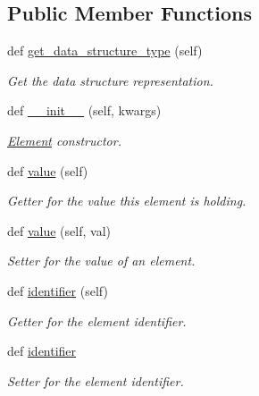 \subsection*{Public Member Functions}
\begin{DoxyCompactItemize}
\item 
def \hyperlink{classbridges_1_1element_1_1_element_a87b8c79123d20eb2af48ae4e4f1bcf32}{get\+\_\+data\+\_\+structure\+\_\+type} (self)
\begin{DoxyCompactList}\small\item\em Get the data structure representation. \end{DoxyCompactList}\item 
def \hyperlink{classbridges_1_1element_1_1_element_ac0291307e216e5f2da60a340a1e2142d}{\+\_\+\+\_\+init\+\_\+\+\_\+} (self, kwargs)
\begin{DoxyCompactList}\small\item\em \hyperlink{classbridges_1_1element_1_1_element}{Element} constructor. \end{DoxyCompactList}\item 
def \hyperlink{classbridges_1_1element_1_1_element_ab89d51b751ad0956d7ec855c35335ad2}{value} (self)
\begin{DoxyCompactList}\small\item\em Getter for the value this element is holding. \end{DoxyCompactList}\item 
def \hyperlink{classbridges_1_1element_1_1_element_a810c122a8b900f476601d565291bdbf8}{value} (self, val)
\begin{DoxyCompactList}\small\item\em Setter for the value of an element. \end{DoxyCompactList}\item 
def \hyperlink{classbridges_1_1element_1_1_element_a8eb98e53169fc83f6adde36e1896cf2f}{identifier} (self)
\begin{DoxyCompactList}\small\item\em Getter for the element identifier. \end{DoxyCompactList}\item 
def \hyperlink{classbridges_1_1element_1_1_element_a70ac403466ed78146974a22cebfa0c19}{identifier}
\begin{DoxyCompactList}\small\item\em Setter for the element identifier. \end{DoxyCompactList}\item 

\end{DoxyCompactItemize}
